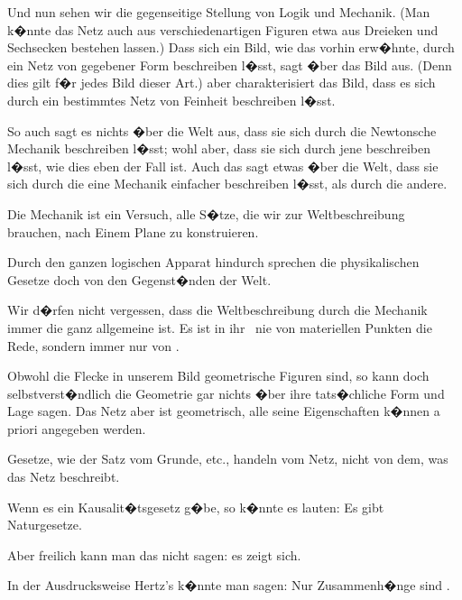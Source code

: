 {Und nun sehen wir die gegenseitige Stellung
von Logik und Mechanik. (Man k�nnte das Netz
auch aus verschiedenartigen Figuren etwa aus
Dreieken und Sechsecken bestehen lassen.) Dass
sich ein Bild, wie das vorhin erw�hnte, durch ein
Netz von gegebener Form beschreiben l�sst, sagt
�ber das Bild  aus. (Denn dies gilt f�r
jedes Bild dieser Art.)  aber charakterisiert
das Bild, dass es sich durch ein bestimmtes Netz
von  Feinheit  beschreiben
l�sst.

So auch sagt es nichts �ber die Welt aus, dass
sie sich durch die Newtonsche Mechanik beschreiben
l�sst; wohl aber, dass sie sich  durch
jene beschreiben l�sst, wie dies eben der Fall ist.
Auch das sagt etwas �ber die Welt, dass sie sich
durch die eine Mechanik einfacher beschreiben
l�sst, als durch die andere.}


{Die Mechanik ist ein Versuch, alle 
S�tze, die wir zur Weltbeschreibung brauchen,
nach Einem Plane zu konstruieren.}


{Durch den ganzen logischen Apparat hindurch
sprechen die physikalischen Gesetze doch von den
Gegenst�nden der Welt.}


{Wir d�rfen nicht vergessen, dass die Weltbeschreibung
durch die Mechanik immer die ganz
allgemeine ist. Es ist in ihr \zumBeispiel\ nie von
 materiellen Punkten die Rede,
sondern immer nur von .}


{Obwohl die Flecke in unserem Bild geometrische
Figuren sind, so kann doch selbstverst�ndlich
die Geometrie gar nichts �ber ihre
tats�chliche Form und Lage sagen. Das Netz
aber ist  geometrisch, alle seine Eigenschaften
k�nnen a priori angegeben werden.

Gesetze, wie der Satz vom Grunde, etc., handeln
vom Netz, nicht von dem, was das Netz beschreibt.}


{Wenn es ein Kausalit�tsgesetz g�be, so k�nnte
es lauten: \glqq{}Es gibt Naturgesetze\grqq{}.

Aber freilich kann man das nicht sagen: es
zeigt sich.}


{In der Ausdrucksweise Hertz's k�nnte man
sagen: Nur  Zusammenh�nge
sind .}


